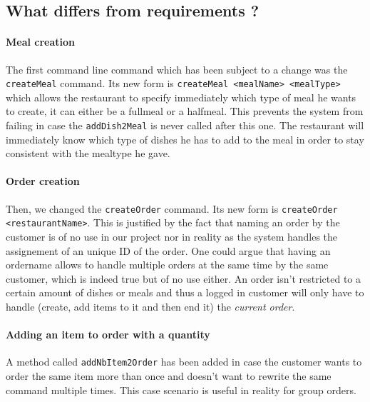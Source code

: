 \subsection{What differs from requirements ?} %
\label{sub:what_differs_from_requirements}

\paragraph{Meal creation} %
\label{par:meal_creation}
The first command line command which has been subject to a change
was the \lstinline|createMeal| command. Its new form is
\lstinline|createMeal <mealName> <mealType>|
which allows the restaurant to specify immediately which type of meal
he wants to create, it can either be a fullmeal or a halfmeal.
This prevents the system from failing in case the \lstinline|addDish2Meal|
is never called after this one.
The restaurant will immediately know which type of dishes he has to add
to the meal in order to stay consistent with the mealtype he gave. 

\paragraph{Order creation} %
\label{par:order_creation}
Then, we changed the \lstinline|createOrder| command. Its new form is
\lstinline|createOrder <restaurantName>|.
This is justified by the fact that naming an order by the customer
is of no use in our project nor in reality as the system
handles the assignement of an unique ID of the order.
One could argue that having an ordername allows to handle
multiple orders at the same time by the same customer,
which is indeed true but of no use either.
An order isn't restricted to a certain amount of dishes
or meals and thus a logged in customer will only
have to handle (create, add items to it and then end it)
the \emph{current order}.

\paragraph{Adding an item to order with a quantity} %
\label{par:add_an_item_to_order_with_a_quantity}
A method called \lstinline|addNbItem2Order| has been added
in case the customer wants to order the same item more than once
and doesn't want to rewrite the same command multiple times.
This case scenario is useful in reality for group orders.

